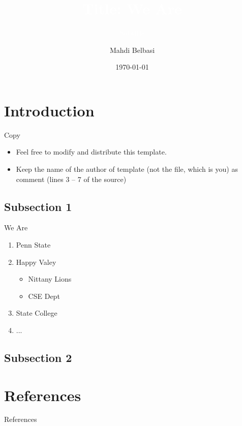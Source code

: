 \documentclass{beamer}
\title{\textcolor{white}{Title: We Are}}
\subtitle{\textcolor{white}{Subtitle}}
\author{Mahdi Belbasi}
\date{\today}
\institute{Pennsylvania State University\\CSE Department\\\url{belbasi@psu.edu}}
\begin{document}
\begin{frame}[plain,t]
\titlepage
\end{frame}


\section{Introduction}
\begin{frame}{Copy}
    \begin{itemize}
        \item<1-> Feel free to modify and distribute this template.
        \item<2-> Keep the name of the author of template (not the file, which is you) as comment (lines 3 -- 7 of the source)
    \end{itemize}
\end{frame}

\subsection{Subsection 1}
\begin{frame}{We Are}
    \begin{enumerate}[I]
        \item<1-> Penn State
        \item<2-> Happy Valey
        \begin{itemize}
            \item<3-> Nittany Lions
            \item<4-> CSE Dept
        \end{itemize}
        \item<5-> State College
        \item<6-> ...
    \end{enumerate}
\end{frame}
\subsection{Subsection 2}



\section{References}
\begin{frame}[allowframebreaks]{References}

\end{frame}

\ThankYouFrame
\end{document}
